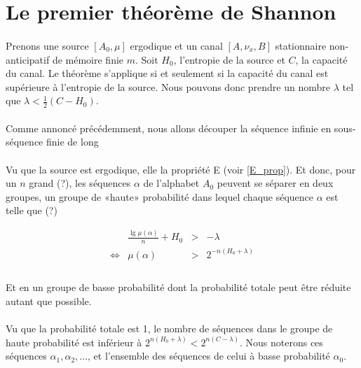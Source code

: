 \section{Le premier théorème de Shannon}

	\paragraph{}
	Prenons une source $[A_0,\mu]$ ergodique et un canal $[A,\nu_x,B]$ stationnaire non-anticipatif de mémoire finie $m$. 
	Soit $H_0$, l'entropie de la source et $C$, la capacité du canal. Le théorème s'applique si et seulement si la capacité 
	du canal est supérieure à l'entropie de la source. Nous pouvons donc prendre un nombre $\lambda$ tel que $\lambda<\frac{1}{2}(C-H_0)$. 
	
	\paragraph{}
	Comme annoncé précédemment, nous allons découper la séquence infinie en sous-séquence finie de long

	\paragraph{}
	Vu que la source est ergodique, elle la propriété E (voir \ref{E_prop}). Et donc, pour un $n$ grand (?), les séquences $\alpha$ de l'alphabet 
	$A_0$ peuvent se séparer en deux groupes, un groupe de «haute» probabilité dans lequel chaque séquence $\alpha$ est telle que (?)
	
	\[
		\begin{array}{crcl}
			&\frac{\lg \mu\left(\alpha\right)}{n}+H_0 &>& -\lambda\\
			\Leftrightarrow & \mu(\alpha) & > &2^{-n\left(H_0+\lambda\right)}\\
		\end{array}
	\]
	
	\paragraph{}
	Et en un groupe de basse probabilité dont la probabilité totale peut être réduite autant que possible.

	\paragraph{}
	Vu que la probabilité totale est 1, le nombre de séquences dans le groupe de haute probabilité est inférieur à $2^{n(H_0+\lambda)}<2^{n(C-\lambda)}$.
	Nous noterons ces séquences $\alpha_1,\alpha_2,\dots$, et l'ensemble des séquences de celui à basse probabilité $\alpha_0$.
	
